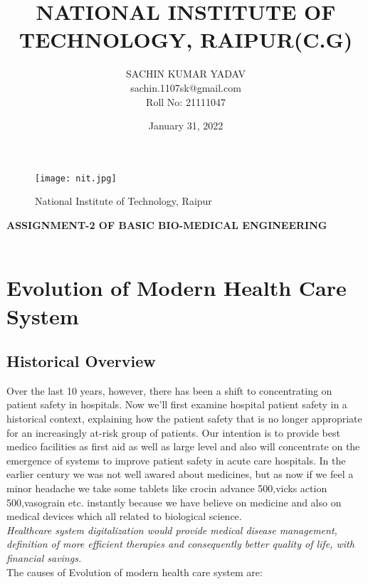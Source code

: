 \documentclass[12pts]{article}
\title{\textbf{NATIONAL INSTITUTE OF TECHNOLOGY, RAIPUR(C.G)}}
\author{SACHIN KUMAR YADAV\\sachin.1107sk@gmail.com\\Roll No: 21111047}
\date{January 31, 2022}
\begin{document}
\maketitle

\begin{figure}[h]
\centering
\texttt{[image: nit.jpg]}
\caption{National Institute of Technology, Raipur}
\end{figure}

\textbf{ASSIGNMENT-2 OF BASIC BIO-MEDICAL ENGINEERING}\\\\

\clearpage
\section*{Evolution of Modern Health Care System}
\subsection*{Historical Overview}

Over the last 10 years, however, there has been a shift to concentrating on patient safety in hospitals. Now we'll  first examine hospital patient safety in a historical context, explaining how the patient safety that is no longer appropriate for an increasingly at-risk group of patients. Our intention is to provide best medico facilities as first aid as well as large level and also will concentrate on the emergence of systems to improve patient safety in acute care hospitals.
In the earlier century we was not well awared about medicines, but as now if we feel a minor headache we take some tablets like crocin advance 500,vicks action 500,vasograin etc. instantly because we have believe on medicine and also on medical devices which all related to biological science.\\

\textit{Healthcare system digitalization would provide medical disease management, definition of more efficient therapies and consequently better quality of life, with financial savings.}\\
The causes of Evolution of modern health care system are:\\
\end{document}
